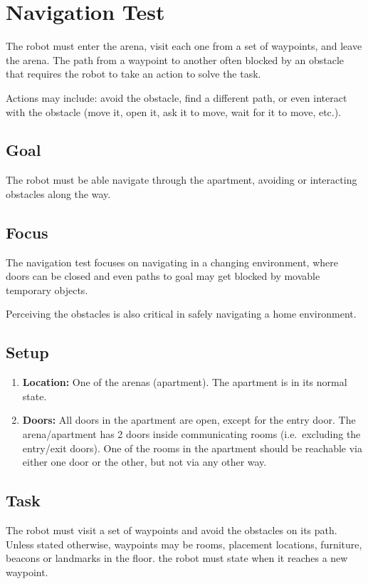 \section{Navigation Test}

The robot must enter the arena, visit each one from a set of waypoints, and leave the arena. The path from a waypoint to another often blocked by an obstacle that requires the robot to take an action to solve the task.

Actions may include: avoid the obstacle, find a different path, or even interact with the obstacle (move it, open it, ask it to move, wait for it to move, etc.).

\subsection{Goal}
The robot must be able navigate through the apartment, avoiding or interacting obstacles along the way.

\subsection{Focus}
The navigation test focuses on navigating in a changing environment, where doors can be closed and even paths to goal may get blocked by movable temporary objects. 

Perceiving the obstacles is also critical in safely navigating a home environment.

\subsection{Setup}

\begin{enumerate}
	\item \textbf{Location:} One of the arenas (apartment). The apartment is in its normal state.
	\item \textbf{Doors:} All doors in the apartment are open, except for the entry door. The arena/apartment has 2 doors inside communicating rooms (i.e.~excluding the entry/exit doors). One of the rooms in the apartment should be reachable via either one door or the other, but not via any other way.
\end{enumerate}

\subsection{Task}
The robot must visit a set of waypoints and avoid the obstacles on its path. Unless stated otherwise, waypoints may be rooms, placement locations, furniture, beacons or landmarks in the floor. the robot must state when it reaches a new waypoint.

